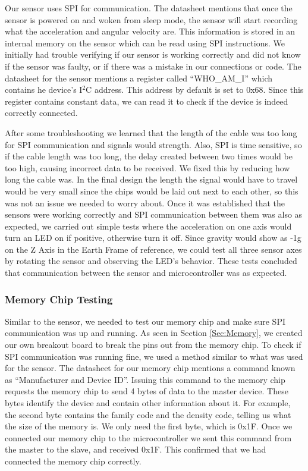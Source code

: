 Our sensor uses SPI for communication.
The datasheet mentions that once the sensor is powered on and woken from sleep mode,
the sensor will start recording what the acceleration and angular velocity are.
This information is stored in an internal memory on the sensor which can be read using SPI instructions.
We initially had trouble verifying if our sensor is working correctly and did not know if the sensor was faulty,
or if there was a mistake in our connections or code.
The datasheet for the sensor mentions a register called ``WHO\_AM\_I'' which contains he device's I$^2$C address.
This address by default is set to 0x68.
Since this register contains constant data, we can read it to check if the device is indeed correctly connected.

After some troubleshooting we learned that the length of the cable was too long for SPI communication and signals would strength.
Also, SPI is time sensitive, so if the cable length was too long,
the delay created between two times would be too high,
causing incorrect data to be received.
We fixed this by reducing how long the cable was.
In the final design the length the signal would have to travel would be very small since the chips would be laid out next to each other,
so this was not an issue we needed to worry about.
Once it was established that the sensors were working correctly and SPI communication between them was also as expected,
we carried out simple tests where the acceleration on one axis would turn an LED on if positive,
otherwise turn it off.
Since gravity would show as -1g on the Z Axis in the Earth Frame of reference,
we could test all three sensor axes by rotating the sensor and observing the LED's behavior.
These tests concluded that communication between the sensor and microcontroller was as expected.

\subsubsection{Memory Chip Testing}
\label{Sec:MemoryTesting}
Similar to the sensor, we needed to test our memory chip and make sure SPI communication was up and running.
As seen in Section \ref{Sec:Memory},
we created our own breakout board to break the pins out from the memory chip.
To check if SPI communication was running fine,
we used a method similar to what was used for the sensor.
The datasheet for our memory chip mentions a command known as ``Manufacturer and Device ID''.
Issuing this command to the memory chip requests the memory chip to send 4 bytes of data to the master device.
These bytes identify the device and contain other information about it. 
For example, the second byte contains the family code and the density code,
telling us what the size of the memory is.
We only need the first byte, which is 0x1F.
Once we connected our memory chip to the microcontroller we sent this command from the master to the slave,
and received 0x1F.
This confirmed that we had connected the memory chip correctly.

